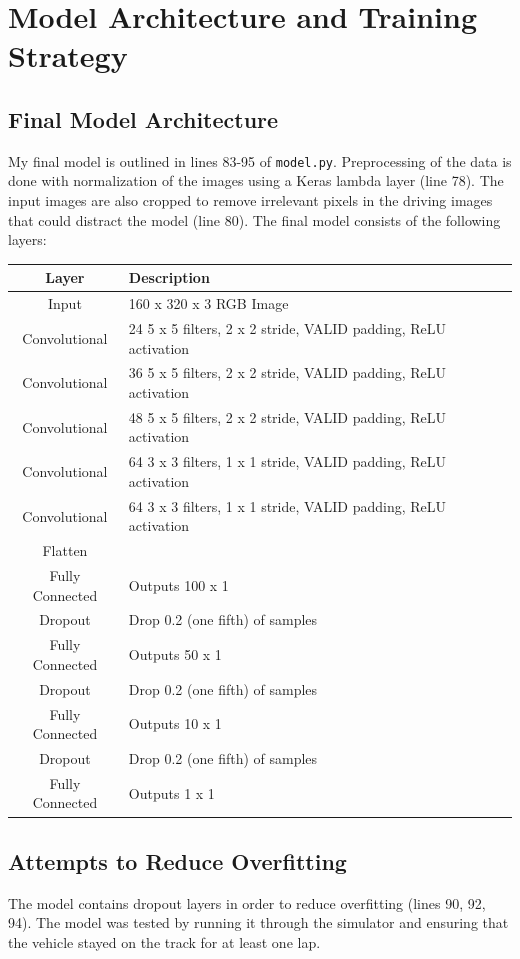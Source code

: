 \documentclass[12pt]{article}
\begin{document}
\section{Model Architecture and Training Strategy}
\subsection{Final Model Architecture}
My final model is outlined in lines 83-95 of \texttt{model.py}. Preprocessing of the data is done with normalization of the images using a Keras lambda layer (line 78). The input images are also cropped to remove irrelevant pixels in the driving images that could distract the model (line 80). The final model consists of the following layers:
\begin{center}
\begin{tabular}{|c|p{10cm}|}
\hline
\textbf{Layer} & \textbf{Description} \\
\hline
Input & 160 x 320 x 3 RGB Image \\
\hline
Convolutional & 24 5 x 5 filters, 2 x 2 stride, VALID padding, ReLU activation \\
\hline
Convolutional & 36 5 x 5 filters, 2 x 2 stride, VALID padding, ReLU activation \\
\hline
Convolutional & 48 5 x 5 filters, 2 x 2 stride, VALID padding, ReLU activation \\
\hline
Convolutional & 64 3 x 3 filters, 1 x 1 stride, VALID padding, ReLU activation \\
\hline
Convolutional & 64 3 x 3 filters, 1 x 1 stride, VALID padding, ReLU activation \\
\hline
Flatten & \\
\hline
Fully Connected & Outputs 100 x 1\\
\hline
Dropout & Drop 0.2 (one fifth) of samples \\
\hline
Fully Connected & Outputs 50 x 1\\
\hline
Dropout & Drop 0.2 (one fifth) of samples \\
\hline
Fully Connected & Outputs 10 x 1\\
\hline
Dropout & Drop 0.2 (one fifth) of samples \\
\hline
Fully Connected & Outputs 1 x 1 \\
\hline
\end{tabular}
\end{center}

\subsection{Attempts to Reduce Overfitting}
The model contains dropout layers in order to reduce overfitting (lines 90, 92, 94). The model was tested by running it through the simulator and ensuring that the vehicle stayed on the track for at least one lap. 
\end{document}
